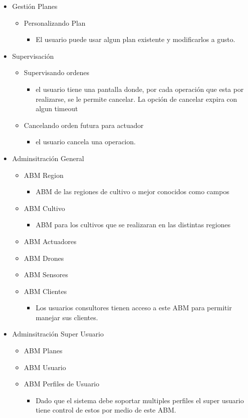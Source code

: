 \begin{itemize}
 \item Gesti\'on Planes
 \begin{itemize}
    \item Personalizando Plan
    \begin{itemize}
	\item El usuario puede usar algun plan existente y modificarlos a gusto.
    \end{itemize}
 \end{itemize}
 \item Supervisaci\'on
 \begin{itemize}
  \item Supervisando ordenes
  \begin{itemize}
    \item el usuario tiene una pantalla donde, por cada operaci\'on que esta por realizarse, se le permite cancelar. La opci\'on de cancelar expira con algun timeout 
  \end{itemize}
  \item Cancelando orden futura para actuador
  \begin{itemize}
    \item el usuario cancela una operacion.
  \end{itemize}
 \end{itemize} 
 \item Adminsitraci\'on General
 \begin{itemize}
    \item ABM Region 
    \begin{itemize}
	\item ABM de las regiones de cultivo o mejor conocidos como campos
    \end{itemize}
    \item ABM Cultivo
    \begin{itemize}
	\item ABM para los cultivos que se realizaran en las distintas regiones
    \end{itemize}
    \item ABM Actuadores
    \item ABM Drones
    \item ABM Sensores
    \item ABM Clientes
    \begin{itemize}
	\item Los usuarios consultores tienen acceso a este ABM para permitir manejar sus clientes.
    \end{itemize}
 \end{itemize}
 \item Adminsitraci\'on Super Usuario
 \begin{itemize}
    \item ABM Planes
    \item ABM Usuario
    \item ABM Perfiles de Usuario
    \begin{itemize}
	\item Dado que el sistema debe soportar multiples perfiles el super usuario tiene control de estos por medio de este ABM.
    \end{itemize}
 \end{itemize}
 

\end{itemize}
